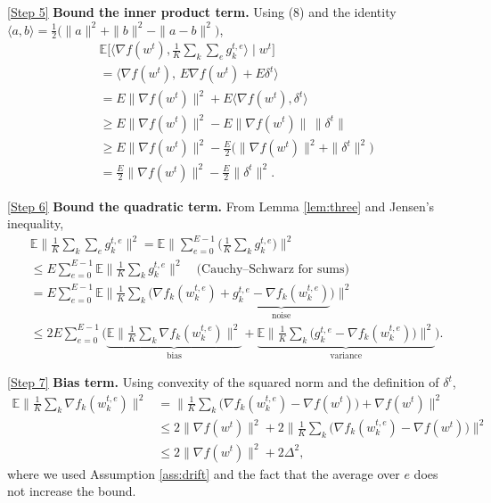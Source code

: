 \documentclass{article}
\newcommand{\E}{\mathbb{E}}
\begin{document}
\medskip
\noindent\underline{[Step 5]} \textbf{Bound the inner product term.}  
Using (8) and the identity $\langle a,b\rangle = \frac12\bigl(\|a\|^{2}+\|b\|^{2}-\|a-b\|^{2}\bigr)$,
\[
\begin{aligned}
&\E\!\Big[\langle\nabla f(w^{t}),\tfrac1K\sum_{k}\sum_{e} g_{k}^{t,e}\rangle\mid w^{t}\Big]\\
&= \langle\nabla f(w^{t}),\,E\nabla f(w^{t})+E\delta^{t}\rangle\\
&= E\|\nabla f(w^{t})\|^{2}+E\langle\nabla f(w^{t}),\delta^{t}\rangle\\
&\ge E\|\nabla f(w^{t})\|^{2}-E\|\nabla f(w^{t})\|\,\|\delta^{t}\| \\
&\ge E\|\nabla f(w^{t})\|^{2}-\frac{E}{2}\bigl(\|\nabla f(w^{t})\|^{2}+ \|\delta^{t}\|^{2}\bigr)\\
&= \frac{E}{2}\|\nabla f(w^{t})\|^{2}-\frac{E}{2}\|\delta^{t}\|^{2}.
\end{aligned} \tag{9}
\]

\medskip
\noindent\underline{[Step 6]} \textbf{Bound the quadratic term.}  
From Lemma \ref{lem:three} and Jensen's inequality,
\[
\begin{aligned}
&\E\!\Big\|\frac1K\sum_{k}\sum_{e} g_{k}^{t,e}\Big\|^{2}
 = \E\!\Big\| \sum_{e=0}^{E-1}\bigl(\frac1K\sum_{k}g_{k}^{t,e}\bigr)\Big\|^{2}\\
&\le E\sum_{e=0}^{E-1}\E\!\Big\|\frac1K\sum_{k}g_{k}^{t,e}\Big\|^{2}
 \quad\text{(Cauchy–Schwarz for sums)}\\
&=E\sum_{e=0}^{E-1}\E\!\Big\|\frac1K\sum_{k}\bigl(\nabla f_k(w_{k}^{t,e})+ \underbrace{g_{k}^{t,e}-\nabla f_k(w_{k}^{t,e})}_{\text{noise}}\bigr)\Big\|^{2}\\
&\le 2E\sum_{e=0}^{E-1}\Bigg(
      \underbrace{\E\!\Big\|\frac1K\sum_{k}\nabla f_k(w_{k}^{t,e})\Big\|^{2}}_{\text{bias}}
      +\underbrace{\E\!\Big\|\frac1K\sum_{k}\bigl(g_{k}^{t,e}-\nabla f_k(w_{k}^{t,e})\bigr)\Big\|^{2}}_{\text{variance}}
    \Bigg).
\end{aligned} \tag{10}
\]

\medskip
\noindent\underline{[Step 7]} \textbf{Bias term.}  
Using convexity of the squared norm and the definition of $\delta^{t}$,
\[
\begin{aligned}
\E\!\Big\|\frac1K\sum_{k}\nabla f_k(w_{k}^{t,e})\Big\|^{2}
&= \Big\|\frac1K\sum_{k}\bigl(\nabla f_k(w_{k}^{t,e})-\nabla f(w^{t})\bigr)+\nabla f(w^{t})\Big\|^{2}\\
&\le 2\Big\|\nabla f(w^{t})\Big\|^{2}+2\Big\|\frac1K\sum_{k}\bigl(\nabla f_k(w_{k}^{t,e})-\nabla f(w^{t})\bigr)\Big\|^{2}\\
&\le 2\|\nabla f(w^{t})\|^{2}+2\Delta^{2},
\end{aligned} \tag{11}
\]
where we used Assumption \ref{ass:drift} and the fact that the average over $e$ does not increase the bound.
\end{document}

